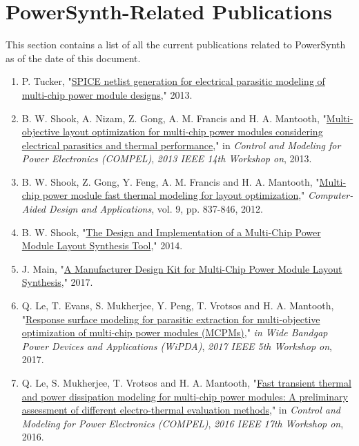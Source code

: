 \documentclass[11pt]{article}
\begin{document}
\section{PowerSynth-Related Publications}


This section contains a list of all the current publications related to PowerSynth as of the date of this document.

\begin{enumerate}
\item P. Tucker, "\href{./Publications/TUCKER-THESIS.pdf}{SPICE netlist generation for electrical parasitic modeling of multi-chip power module designs}," 2013.

\item B. W. Shook, A. Nizam, Z. Gong, A. M. Francis and H. A. Mantooth, "\href{./Publications/COMPEL paper.pdf}{Multi-objective layout optimization for multi-chip power modules considering electrical parasitics and thermal performance}," in \emph{Control and Modeling for Power Electronics (COMPEL)}, \emph{2013 IEEE 14th Workshop on}, 2013.

\item B. W. Shook, Z. Gong, Y. Feng, A. M. Francis and H. A. Mantooth, "\href{./Publications/CAD_9_6__837-846.pdf}{Multi-chip power module fast thermal modeling for layout optimization}," \emph{Computer-Aided Design and Applications}, vol. 9, pp. 837-846, 2012.

\item B. W. Shook, "\href{./Publications/Shook_Brett_thesis.pdf}{The Design and Implementation of a Multi-Chip Power Module Layout Synthesis Tool}," 2014.

\item J. Main, "\href{./Publications/Jonathan_Main_Thesis.pdf}{A Manufacturer Design Kit for Multi-Chip Power Module Layout Synthesis}," 2017.

\item Q. Le, T. Evans, S. Mukherjee, Y. Peng, T. Vrotsos and H. A. Mantooth, "\href{./Publications/WIPDA 2017.pdf}{Response surface modeling for parasitic extraction for multi-objective optimization of multi-chip power modules (MCPMs)}," \emph{in Wide Bandgap Power Devices and Applications (WiPDA)}, \emph{2017 IEEE 5th Workshop on}, 2017.

\item Q. Le, S. Mukherjee, T. Vrotsos and H. A. Mantooth, "\href{./Publications/COMPEL_2016_paper_140.pdf}{Fast transient thermal and power dissipation modeling for multi-chip power modules: A preliminary assessment of different electro-thermal evaluation methods}," in \emph{Control and Modeling for Power Electronics (COMPEL)}, \emph{2016 IEEE 17th Workshop on}, 2016.


\end{enumerate}
\end{document}
